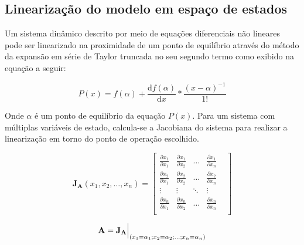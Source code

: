 \documentclass[a4paper]{ifacconf}
\begin{document}
    \subsection{Linearização do modelo em espaço de estados}
    
    Um sistema dinâmico descrito por meio de equações diferenciais não lineares pode ser linearizado na proximidade de um ponto de equilíbrio através do método da expansão em série de Taylor truncada no seu segundo termo como exibido na equação a seguir:
    
    \begin{equation}
        P(x) = f(\alpha) + \dfrac{\mathrm{d}f(\alpha)}{\mathrm{d}x}*\frac{(x-\alpha)^{-1}}{1!}    
    \end{equation}
    
    Onde $\alpha$ é um ponto de equilíbrio da equação $P(x)$.  
    Para um sistema com múltiplas variáveis de estado, calcula-se a Jacobiana do sistema para realizar a linearização em torno do ponto de operação escolhido.  
    
    \begin{equation} \label{eq:Jacobian_A}
    \mathbf{J_A}(x_1,x_2,\dots,x_n) =
        \begin{bmatrix}
            \frac{\partial x_1}{\partial x_1} & 
            \frac{\partial x_1}{\partial x_2} & 
            \dots &
            \frac{\partial x_1}{\partial x_n} &\\[1ex]
            \frac{\partial x_2}{\partial x_1} & 
            \frac{\partial x_2}{\partial x_2} & 
            \dots &
            \frac{\partial x_2}{\partial x_n} &\\[1ex]
            \vdots & 
            \vdots & 
            \ddots &
            \vdots &\\[1ex]
            \frac{\partial x_n}{\partial x_1} & 
            \frac{\partial x_n}{\partial x_2} & 
            \dots &
            \frac{\partial x_n}{\partial x_n} &\\[1ex]
    \end{bmatrix}
    \end{equation}
    
    \begin{equation} \label{eq:eval_A}
        \mathbf{A=J_A} \Bigr\rvert_{(x_1=\alpha_1;x_2=\alpha_2;\dots;x_n=\alpha_n)} \\
    \end{equation}
    
\end{document}
